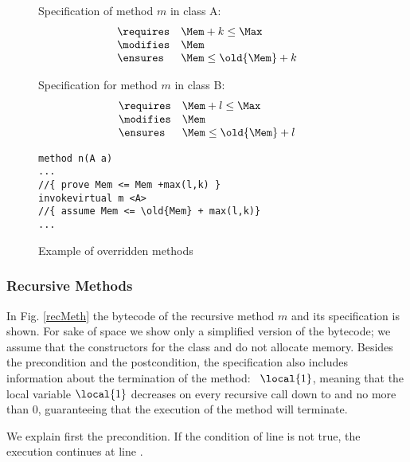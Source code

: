 \begin{figure}[!htp]
Specification of method $m$ in class A:
$$
\begin{array}{ll}
\requires & \Mem + k  \leq \Max \\
\modifies & \Mem \\
\ensures & \Mem  \leq \old{\Mem} + k
\end{array}
$$

Specification for method $m$ in class B:
$$
\begin{array}{ll}
\requires & \Mem + l  \leq \Max \\
\modifies & \Mem \\
\ensures & \Mem  \leq \old{\Mem} + l
\end{array}
$$

\begin{verbatim}
method n(A a)
...
//{ prove Mem <= Mem +max(l,k) }
invokevirtual m <A>
//{ assume Mem <= \old{Mem} + max(l,k)}
...
\end{verbatim}
\caption{\sc Example of overridden methods}
\label{classExt}
\end{figure}


\subsubsection{Recursive Methods} In Fig. \ref{recMeth} the bytecode of the recursive method $m$ and its specification is shown. For sake of space we show only a simplified version of the bytecode; we assume that the constructors for the class  and  do not allocate memory. Besides the precondition and the postcondition, the specification also includes information about the termination of the method: \variant\ $\local{1}$, meaning that the local variable $\local{1}$ decreases on every recursive call down to and no more than $0$, guaranteeing that the execution of the method will terminate.
 

We explain first the precondition. If the condition of line  is not true, the execution continues at line .

